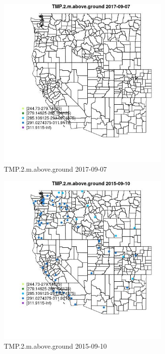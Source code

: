 \begin{figure} 
\centering  
\includegraphics[width=0.77\textwidth]{Code_Outputs/Report_ML_input_PM25_Step4_part_e_de_duplicated_aveswNAs_MapObsTMP2maboveground2017-09-07.jpg} 
\caption{\label{fig:Report_ML_input_PM25_Step4_part_e_de_duplicated_aveswNAsMapObsTMP2maboveground2017-09-07}TMP.2.m.above.ground 2017-09-07} 
\end{figure} 
 

\begin{figure} 
\centering  
\includegraphics[width=0.77\textwidth]{Code_Outputs/Report_ML_input_PM25_Step4_part_e_de_duplicated_aveswNAs_MapObsTMP2maboveground2015-09-10.jpg} 
\caption{\label{fig:Report_ML_input_PM25_Step4_part_e_de_duplicated_aveswNAsMapObsTMP2maboveground2015-09-10}TMP.2.m.above.ground 2015-09-10} 
\end{figure} 
 


